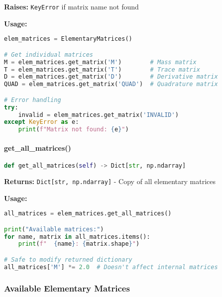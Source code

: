 \textbf{Raises:} \texttt{KeyError} if matrix name not found

\textbf{Usage:}
\begin{lstlisting}[language=Python, caption=Get Matrix Usage]
elem_matrices = ElementaryMatrices()

# Get individual matrices
M = elem_matrices.get_matrix('M')        # Mass matrix
T = elem_matrices.get_matrix('T')        # Trace matrix  
D = elem_matrices.get_matrix('D')        # Derivative matrix
QUAD = elem_matrices.get_matrix('QUAD')  # Quadrature matrix

# Error handling
try:
    invalid = elem_matrices.get_matrix('INVALID')
except KeyError as e:
    print(f"Matrix not found: {e}")
\end{lstlisting}

\paragraph{get\_all\_matrices()}\leavevmode
\begin{lstlisting}[language=Python, caption=Get All Matrices Method]
def get_all_matrices(self) -> Dict[str, np.ndarray]
\end{lstlisting}

\textbf{Returns:} \texttt{Dict[str, np.ndarray]} - Copy of all elementary matrices

\textbf{Usage:}
\begin{lstlisting}[language=Python, caption=Get All Matrices Usage]
all_matrices = elem_matrices.get_all_matrices()

print("Available matrices:")
for name, matrix in all_matrices.items():
    print(f"  {name}: {matrix.shape}")

# Safe to modify returned dictionary
all_matrices['M'] *= 2.0  # Doesn't affect internal matrices
\end{lstlisting}

\subsubsection{Available Elementary Matrices}

